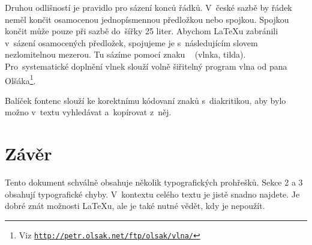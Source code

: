 \documentclass[czech,a4paper,10pt,twocolumn]{article}
\begin{document}
Druhou odlišností je pravidlo pro sázení konců řádků. V~české sazbě by řádek neměl končit osamocenou jednopísmennou předložkou nebo spojkou. Spojkou  končit může pouze při sazbě do~šířky 25 liter. Abychom \LaTeX u zabránili v~sázení osamocených předložek, spojujeme je s~následujícím slovem nezlomitelnou mezerou. Tu sázíme pomocí znaku ~ (vlnka, tilda). Pro~systematické doplnění vlnek slouží volně šiřitelný program vlna od pana Olšáka\footnote{Viz \texttt{\url{http://petr.olsak.net/ftp/olsak/vlna/}}}.

Balíček fontenc slouží ke korektnímu kódovaní znaků s~diakritikou, aby bylo možno v~textu vyhledávat a~kopírovat z~něj.

\section{Závěr}

Tento dokument schválně obsahuje několik typografických prohřešků. Sekce 2 a 3 obsahují typografické chyby. V~kontextu celého textu je jistě snadno najdete. Je dobré znát možnosti \LaTeX u, ale je také nutné vědět, kdy je nepoužít.
\end{document}
